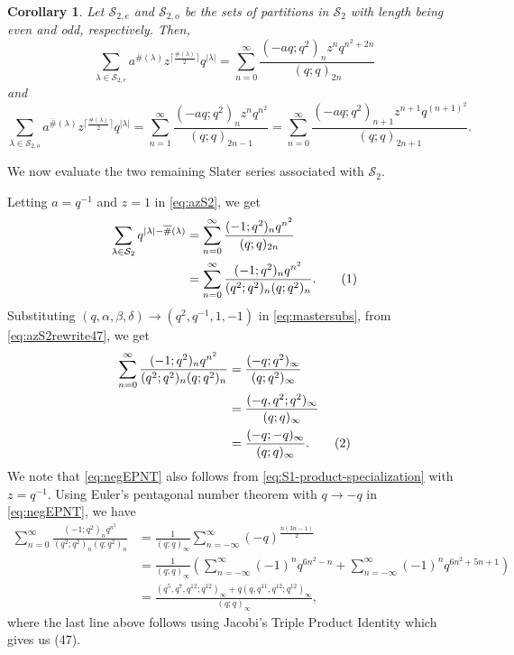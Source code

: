 \documentclass[11pt]{amsart}
\newtheorem{cor}[theorem]{Corollary}
\theoremstyle{definition}
\theoremstyle{remark}
\numberwithin{equation}{section}
\newcommand\numberthis{\addtocounter{equation}{1}\tag{\theequation}}
\begin{document}
\begin{cor}
Let $\mathcal{S}_{2,e}$ and $\mathcal{S}_{2,o}$ be the sets of partitions in $\mathcal{S}_2$ with length being even and odd, respectively. Then,
\begin{equation}
\sum_{\lambda\in\mathcal{S}_{2,e}}a^{\overline{\#}(\lambda)}z^{\lceil\frac{\#(\lambda)}{2}\rceil}q^{|\lambda|}=\sum_{n=0}^{\infty}\frac{(-aq;q^2)_{n}z^nq^{n^2+2n}}{(q;q)_{2n}}
\end{equation}
and
\begin{equation}
\sum_{\lambda\in\mathcal{S}_{2,o}}a^{\overline{\#}(\lambda)}z^{\lceil\frac{\#(\lambda)}{2}\rceil}q^{|\lambda|}=\sum_{n=1}^{\infty}\frac{(-aq;q^2)_{n}z^nq^{n^2}}{(q;q)_{2n-1}}=\sum_{n=0}^{\infty}\frac{(-aq;q^2)_{n+1}z^{n+1}q^{(n+1)^2}}{(q;q)_{2n+1}}.
\end{equation}
\end{cor}
We now evaluate the two remaining Slater series associated with $\mathcal S_2$.


Letting $a = q^{-1}$ and $z = 1$ in \eqref{eq:azS2}, we get
\begin{align*}
\sum\limits_{\lambda\in\mathcal{S}_2}q^{|\lambda|-\overline{\#}(\lambda)} &= \sum\limits_{n=0}^{\infty}\frac{(-1;q^2)_nq^{n^2}}{(q;q)_{2n}}\\
&= \sum\limits_{n=0}^{\infty}\frac{(-1;q^2)_nq^{n^2}}{(q^2;q^2)_{n}(q;q^2)_{n}}.\numberthis\label{eq:azS2rewrite47}
\end{align*}
Substituting $(q,\alpha,\beta,\delta)\rightarrow (q^2,q^{-1},1,-1)$ in \eqref{eq:mastersubs}, from \eqref{eq:azS2rewrite47}, we get
\begin{align*}
\sum\limits_{n=0}^{\infty}\frac{(-1;q^2)_nq^{n^2}}{(q^2;q^2)_{n}(q;q^2)_{n}} &= \frac{(-q;q^2)_{\infty}}{(q;q^2)_{\infty}}\\
&= \frac{(-q,q^2;q^2)_{\infty}}{(q;q)_{\infty}}\\
&= \frac{(-q;-q)_{\infty}}{(q;q)_{\infty}}.\numberthis\label{eq:negEPNT}
\end{align*}
We note that \eqref{eq:negEPNT} also follows from \eqref{eq:S1-product-specialization} with $z=q^{-1}$. Using Euler's pentagonal number theorem \cite{A} with $q\rightarrow -q$ in \eqref{eq:negEPNT}, we have
\begin{align*}
\sum\limits_{n=0}^{\infty}\frac{(-1;q^2)_nq^{n^2}}{(q^2;q^2)_{n}(q;q^2)_{n}} &= \frac{1}{(q;q)_{\infty}}\sum\limits_{n=-\infty}^{\infty}(-q)^{\frac{n(3n-1)}{2}}\\
&= \frac{1}{(q;q)_{\infty}}\left(\sum\limits_{n=-\infty}^{\infty}(-1)^nq^{6n^2-n} + \sum\limits_{n=-\infty}^{\infty}(-1)^nq^{6n^2+5n+1}\right)\\
&= \frac{(q^5,q^7,q^{12};q^{12})_{\infty}+q(q,q^{11},q^{12};q^{12})_{\infty}}{(q;q)_{\infty}},
\end{align*}
where the last line above follows using Jacobi's Triple Product Identity which gives us (47).
\end{document}
